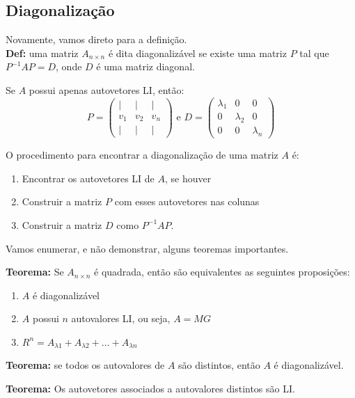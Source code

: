 \documentclass[12pt]{article}
\begin{document}
\subsection{Diagonalização}

Novamente, vamos direto para a definição.\\

\textbf{Def:} uma matriz $A_{n\times n}$ é dita diagonalizável se existe uma matriz $P$ tal que $P^{-1}AP=D$, onde $D$ é uma matriz diagonal.

Se $A$ possui apenas autovetores LI, então:
\begin{equation*}
	P=\begin{pmatrix}
		| & | & |\\
		v_1 & v_2 & v_n\\
		| & | & |
	\end{pmatrix} \mbox{ e }
	D=\begin{pmatrix}
		\lambda_1 & 0 & 0 \\
		0 & \lambda_2 & 0 \\
		0 & 0 & \lambda_n
	\end{pmatrix}
\end{equation*}

O procedimento para encontrar a diagonalização de uma matriz $A$ é:
\begin{enumerate}
	\item Encontrar os autovetores LI de $A$, se houver
	\item Construir a matriz $P$ com esses autovetores nas colunas
	\item Construir a matriz $D$ como $P^{-1}AP$.
\end{enumerate}

Vamos enumerar, e não demonstrar, alguns teoremas importantes. 

\textbf{Teorema:} Se $A_{n\times n}$ é quadrada, então são equivalentes as seguintes proposições:
\begin{enumerate}
	\item $A$ é diagonalizável
	\item $A$ possui $n$ autovalores LI, ou seja, $A=MG$
	\item $R^n=A_{\lambda1}+A_{\lambda2}+...+A_{\lambda n}$ 
\end{enumerate}

\textbf{Teorema:} se todos os autovalores de $A$ são distintos, então $A$ é diagonalizável.

\textbf{Teorema:} Os autovetores associados a autovalores distintos são LI.
\end{document}
